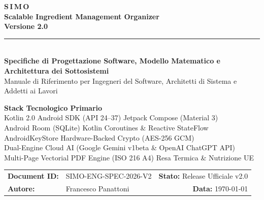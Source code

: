 \documentclass[11pt,a4paper,titlepage]{article}
\begin{document}
\begin{titlepage}
    \centering
    \vspace*{1cm}
    
    {\Huge \bfseries \color{techNavy} S\,I\,M\,O}\\[0.3cm]
    {\LARGE \bfseries \color{techBlue} Scalable Ingredient Management Organizer}\\[0.3cm]
    {\large \bfseries \color{techNavy} Versione 2.0}\\[0.8cm]
    
    {\color{techBorder}\rule{0.85\textwidth}{1.5pt}}\\[1.2cm]
    
    {\LARGE \bfseries Specifiche di Progettazione Software, Modello Matematico e Architettura dei Sottosistemi}\\[0.5cm]
    {\large Manuale di Riferimento per Ingegneri del Software, Architetti di Sistema e Addetti ai Lavori}\\[2.2cm]
    
    \begin{tcolorbox}[
        enhanced,
        colback=techLightBg,
        colframe=techNavy,
        arc=4mm,
        width=0.85\textwidth,
        boxrule=1.2pt
    ]
        \centering
        \vspace{0.2cm}
        \textbf{\color{techNavy} Stack Tecnologico Primario}\\[0.15cm]
        Kotlin 2.0 \textbullet{} Android SDK (API 24--37) \textbullet{} Jetpack Compose (Material 3)\\[0.1cm]
        Android Room (SQLite) \textbullet{} Kotlin Coroutines \& Reactive StateFlow\\[0.1cm]
        AndroidKeyStore Hardware-Backed Crypto (AES-256 GCM)\\[0.1cm]
        Dual-Engine Cloud AI (Google Gemini v1beta \& OpenAI ChatGPT API)\\[0.1cm]
        Multi-Page Vectorial PDF Engine (ISO 216 A4) \textbullet{} Resa Termica \& Nutrizione UE\\[0.2cm]
    \end{tcolorbox}
    
    \vfill
    
    \begin{tabularx}{0.85\textwidth}{lXr}
        \textbf{Document ID:} & SIMO-ENG-SPEC-2026-V2 & \textbf{Stato:} Release Ufficiale v2.0 \\
        \textbf{Autore:} & Francesco Panattoni & \textbf{Data:} \today \\
    \end{tabularx}
    \vspace*{0.5cm}
\end{titlepage}
\end{document}
